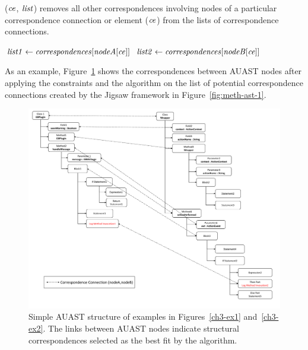 \begin{algorithm}
\caption{($\mathit{ce}$, $\mathit{list}$) removes all other correspondences involving nodes of a particular correspondence connection or element ($\mathit{ce}$) from the lists of correspondence connections.}
\label{removeOtherCEs}
  \begin{algorithmic}[1]
  \RemoveOtherCEs
       \State $\mathit{list1} \gets \mathit{correspondences}[\mathit{nodeA}[\mathit{ce}]]$
	   \State $\mathit{list2} \gets \mathit{correspondences}[\mathit{nodeB}[\mathit{ce}]]$
	   		 \EndIf
	   \EndFor		
	 	 	 		 
	   		 \EndIf
	   \EndFor	  	
  \end{algorithmic}
\end{algorithm}

As an example, Figure~\ref{fig:AUASTs} shows the correspondences between AUAST nodes after applying the constraints and the  algorithm on the list of potential correspondence connections created by the Jigsaw framework in Figure~\ref{fig:meth-ast-1}.

\begin{figure} [H]
  \centering\includegraphics [width = \textwidth]{Drawing4/FinalCorr.pdf}
  \caption{Simple AUAST structure of examples in Figures~\ref{ch3-ex1} and~\ref{ch3-ex2}. The links between AUAST nodes indicate structural correspondences selected as the best fit by the  algorithm.}
  \label{fig:AUASTs}
\end{figure}


